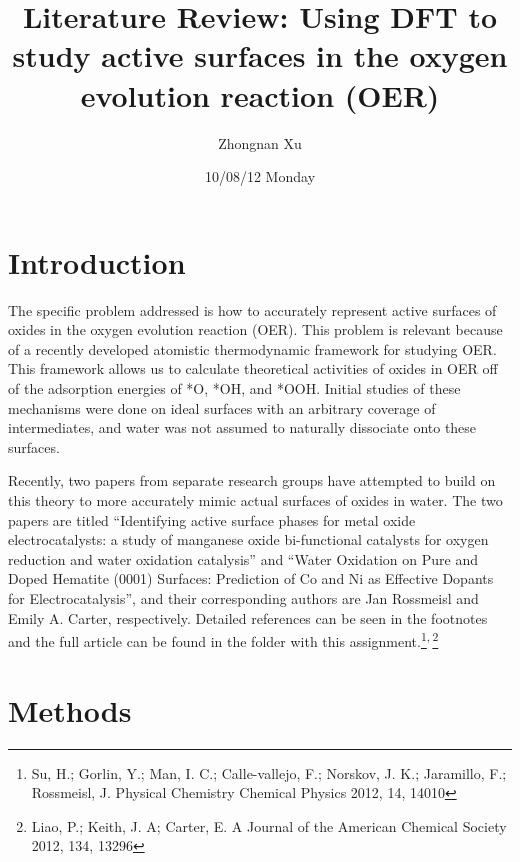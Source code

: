 \documentclass[11pt]{article}
\title{Literature Review: Using DFT to study active surfaces in the oxygen evolution reaction (OER)}
\author{Zhongnan Xu}
\date{10/08/12 Monday}
\begin{document}
\maketitle



\section{Introduction}
\label{sec-1}

  The specific problem addressed is how to accurately represent active
  surfaces of oxides in the oxygen evolution reaction (OER).
  This problem is relevant because of a recently developed atomistic 
  thermodynamic framework for studying OER.
  This framework allows us to calculate theoretical activities of oxides in 
  OER off of the adsorption energies of *O, *OH, and *OOH. 
  Initial studies of these mechanisms were done on ideal surfaces with
  an arbitrary coverage of intermediates, and water was not assumed to
  naturally dissociate onto these surfaces.
  
  Recently, two papers from separate research groups have attempted to
  build on this theory to more accurately mimic actual surfaces of
  oxides in water.
  The two papers are titled ``Identifying active surface phases for metal oxide
  electrocatalysts: a study of manganese oxide bi-functional catalysts
  for oxygen reduction and water oxidation catalysis'' and ``Water
  Oxidation on Pure and Doped Hematite (0001) Surfaces: Prediction of Co
  and Ni as Effective Dopants for Electrocatalysis'', and their
  corresponding authors are Jan Rossmeisl and Emily A. Carter,
  respectively.
  Detailed references can be seen in the footnotes and the full article
  can be found in the folder with this assignment.\footnote{Su, H.; Gorlin, Y.; Man, I. C.; Calle-vallejo, F.; Norskov, J. K.;
Jaramillo, F.; Rossmeisl, J. Physical Chemistry Chemical Physics 2012,
14, 14010
 }\textsuperscript{,}\,\footnote{Liao, P.; Keith, J. A; Carter, E. A Journal of the American Chemical
Society 2012, 134, 13296
 }
  
\section{Methods}
\label{sec-2}
\end{document}
